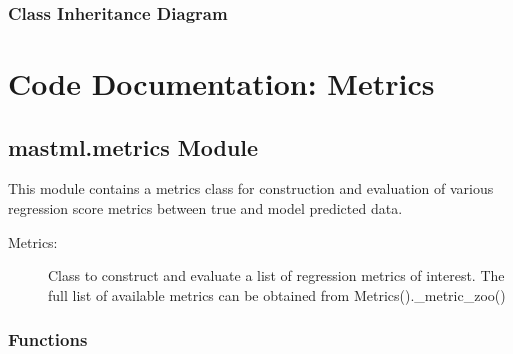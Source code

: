 \documentclass[letterpaper,10pt,english]{sphinxmanual}
\begin{document}
\subsection{Class Inheritance Diagram}
\label{\detokenize{9_mastml:class-inheritance-diagram}}


\chapter{Code Documentation: Metrics}
\label{\detokenize{10_metrics:code-documentation-metrics}}\label{\detokenize{10_metrics::doc}}

\section{mastml.metrics Module}
\label{\detokenize{10_metrics:module-mastml.metrics}}\label{\detokenize{10_metrics:mastml-metrics-module}}
This module contains a metrics class for construction and evaluation of various regression score metrics between
true and model predicted data.
\begin{description}
\item[{Metrics:}] \leavevmode
Class to construct and evaluate a list of regression metrics of interest. The full list of available metrics
can be obtained from Metrics().\_metric\_zoo()

\end{description}


\subsection{Functions}
\label{\detokenize{10_metrics:functions}}
\end{document}
